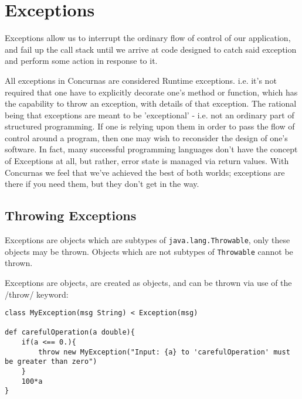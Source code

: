 \documentclass[conc-doc]{subfiles}
\begin{document}
	
	\chapter[Exceptions]{Exceptions}


Exceptions allow us to interrupt the ordinary flow of control of our application, and fail up the call stack until we arrive at code designed to catch said exception and perform some action in response to it. 

All exceptions in Concurnas are considered Runtime exceptions. i.e. it's not required that one have to explicitly decorate one's method or function, which has the capability to throw an exception, with details of that exception. The rational being that exceptions are meant to be 'exceptional' - i.e. not an ordinary part of structured programming. If one is relying upon them in order to pass the flow of control around a program, then one may wish to reconsider the design of one's software. In fact, many successful programming languages don't have the concept of Exceptions at all, but rather, error state is managed via return values. With Concurnas we feel that we've achieved the best of both worlds; exceptions are there if you need them, but they don't get in the way.

\section{Throwing Exceptions}
Exceptions are objects which are subtypes of \lstinline{java.lang.Throwable}, only these objects may be thrown. Objects which are not subtypes of \lstinline{Throwable} cannot be thrown.

Exceptions are objects, are created as objects, and can be thrown via use of the /throw/ keyword:
\begin{lstlisting}
class MyException(msg String) < Exception(msg)

def carefulOperation(a double){
	if(a <== 0.){
		throw new MyException("Input: {a} to 'carefulOperation' must be greater than zero")
	}
	100*a
}
\end{lstlisting}
\end{document}
